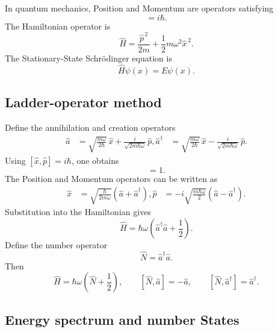 \documentclass[a4paper, 10pt, onepage]{elegantbook}
\begin{document}
{In quantum mechanics, Position and Momentum are operators satisfying
\begin{equation}
  [\hat{x},\hat{p}]=i\hbar.
\end{equation}
The Hamiltonian operator is
\begin{equation}
  \hat{H}
  =\frac{\hat{p}^{\,2}}{2m}
   +\frac{1}{2}m\omega^2\hat{x}^{\,2}.
\end{equation}
The Stationary-State Schr\"odinger equation is
\begin{equation}
  \hat{H}\psi(x)=E\psi(x).
\end{equation}

\subsection{Ladder-operator method}

\noindent

Define the annihilation and creation operators
\begin{align}
  \hat{a}
  &=\sqrt{\frac{m\omega}{2\hbar}}\,\hat{x}
    +\frac{i}{\sqrt{2m\hbar\omega}}\,\hat{p},
  \hat{a}^{\dagger}
  &=\sqrt{\frac{m\omega}{2\hbar}}\,\hat{x}
    -\frac{i}{\sqrt{2m\hbar\omega}}\,\hat{p}.
\end{align}
Using $[\hat{x},\hat{p}]=i\hbar$, one obtains
\begin{equation}
  [\hat{a},\hat{a}^{\dagger}]=1.
\end{equation}
The Position and Momentum operators can be written as
\begin{align}
  \hat{x}
  &=\sqrt{\frac{\hbar}{2m\omega}}
    \left(\hat{a}+\hat{a}^{\dagger}\right),
  \hat{p}
  &=-i\sqrt{\frac{m\hbar\omega}{2}}
    \left(\hat{a}-\hat{a}^{\dagger}\right).
\end{align}
Substitution into the Hamiltonian gives
\begin{equation}
  \hat{H}
  =\hbar\omega\left(\hat{a}^{\dagger}\hat{a}
  +\frac{1}{2}\right).
\end{equation}
Define the number operator
\begin{equation}
  \hat{N}=\hat{a}^{\dagger}\hat{a}.
\end{equation}
Then
\begin{equation}
  \hat{H}=\hbar\omega\left(\hat{N}+\frac{1}{2}\right),
  \qquad
  [\hat{N},\hat{a}]=-\hat{a},
  \qquad
  [\hat{N},\hat{a}^{\dagger}]=\hat{a}^{\dagger}.
\end{equation}

\subsection{Energy spectrum and number States}

}
\end{document}
